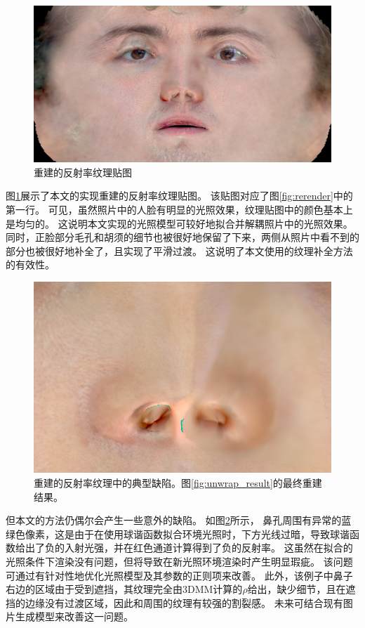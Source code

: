 \begin{figure}
    \centering
    \includegraphics[width=\linewidth]{figures/diffrast_face/00015/final_diffuse}
    \caption{重建的反射率纹理贴图}
    \label{fig:diffuse_map}
\end{figure}
图\ref{fig:diffuse_map}展示了本文的实现重建的反射率纹理贴图。
该贴图对应了图\ref{fig:rerender}中的第一行。
可见，虽然照片中的人脸有明显的光照效果，纹理贴图中的颜色基本上是均匀的。
这说明本文实现的光照模型可较好地拟合并解耦照片中的光照效果。
同时，正脸部分毛孔和胡须的细节也被很好地保留了下来，两侧从照片中看不到的部分也被很好地补全了，且实现了平滑过渡。
这说明了本文使用的纹理补全方法的有效性。
\begin{figure}[tb]
    \centering
    \includegraphics[width=0.6\linewidth,trim={0 0 0 200},clip]{figures/diffrast_face/04114/final_diffuse_center}
    \caption[重建的反射率纹理中的典型缺陷]{重建的反射率纹理中的典型缺陷。图\ref{fig:unwrap_result}的最终重建结果。}
    \label{fig:diffuse_map_defect}
\end{figure}
但本文的方法仍偶尔会产生一些意外的缺陷。
如图\ref{fig:diffuse_map_defect}所示，
鼻孔周围有异常的蓝绿色像素，这是由于在使用球谐函数拟合环境光照时，下方光线过暗，导致球谐函数给出了负的入射光强，并在红色通道计算得到了负的反射率。
这虽然在拟合的光照条件下渲染没有问题，但将导致在新光照环境渲染时产生明显瑕疵。
该问题可通过有针对性地优化光照模型及其参数的正则项来改善。
此外，该例子中鼻子右边的区域由于受到遮挡，其纹理完全由3DMM计算的$\rho$给出，缺少细节，且在遮挡的边缘没有过渡区域，因此和周围的纹理有较强的割裂感。
未来可结合现有图片生成模型来改善这一问题。

